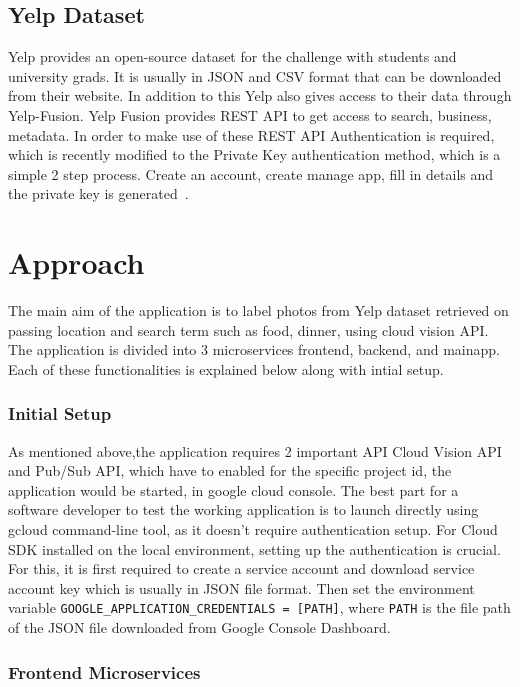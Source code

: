 \subsection{Yelp Dataset}

Yelp provides an open-source dataset for the challenge with students
and university grads. It is usually in JSON and CSV format that can be
downloaded from their website. In addition to this Yelp also gives
access to their data through Yelp-Fusion. Yelp Fusion provides REST
API to get access to search, business, metadata. In order to make use
of these REST API Authentication is required, which is recently
modified to the Private Key authentication method, which is a simple 2
step process. Create an account, create manage app, fill in details
and the private key is generated~\cite{hid-sp18-602-yelp}.

\section{Approach}

The main aim of the application is to label photos from Yelp dataset
retrieved on passing location and search term such as food, dinner,
using cloud vision API. The application is divided into 3
microservices frontend, backend, and mainapp. Each of these
functionalities is explained below along with intial setup.

\subsubsection{Initial Setup} 

As mentioned above,the application requires 2 important API Cloud
Vision API and Pub/Sub API, which have to enabled for the specific
project id, the application would be started, in google cloud
console. The best part for a software developer to test the working
application is to launch directly using gcloud command-line tool, as
it doesn’t require authentication setup.  For Cloud SDK installed on
the local environment, setting up the authentication is crucial. For
this, it is first required to create a service account and download
service account key which is usually in JSON file format. Then set the
environment variable \verb|GOOGLE_APPLICATION_CREDENTIALS = [PATH]|,
where \verb|PATH| is the file path of the JSON file downloaded from Google
Console Dashboard.

\subsubsection{Frontend Microservices} 

